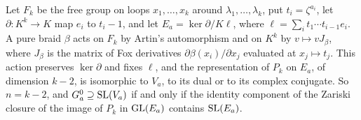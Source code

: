 \begin{lemma}\label{lem:foxmodel}
Let $F_{k}$ be the free group on loops $x_{1},\dots,x_{k}$ around
$\lambda_{1},\dots,\lambda_{k}$, put $t_{i}=\zeta^{a_{i}}$, let
$\partial\colon K^{k}\to K$ map $e_{i}$ to $t_{i}-1$, and let
$E_{a}=\ker\partial/K\ell$, where $\ell=\sum_{i}t_{1}\cdots t_{i-1}e_{i}$. A pure
braid $\beta$ acts on $F_{k}$ by Artin's automorphism and on $K^{k}$ by
$v\mapsto vJ_{\beta}$, where $J_{\beta}$ is the matrix of Fox derivatives
$\partial\beta(x_{i})/\partial x_{j}$ evaluated at $x_{j}\mapsto t_{j}$. This
action preserves $\ker\partial$ and fixes $\ell$, and the representation of
$P_{k}$ on $E_{a}$, of dimension $k-2$, is isomorphic to $V_{a}$, to its dual
or to its complex conjugate. So $n=k-2$, and $G_{a}^{0}\supseteq\operatorname{SL}(V_{a})$ if
and only if the identity component of the Zariski closure of the image of
$P_{k}$ in $\operatorname{GL}(E_{a})$ contains $\operatorname{SL}(E_{a})$.
\end{lemma}

